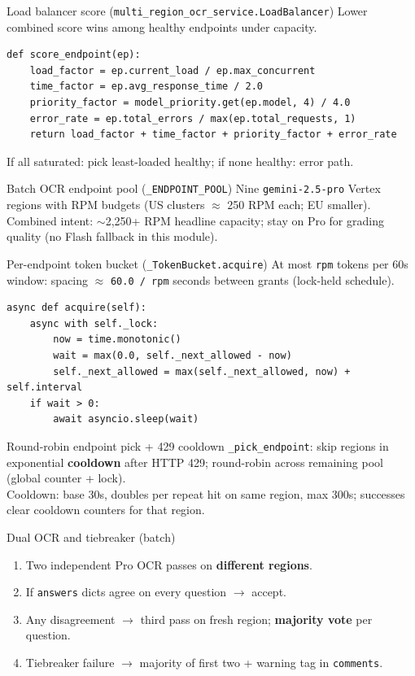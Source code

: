 \documentclass[aspectratio=169]{beamer}
\begin{document}
\begin{frame}[fragile]{Load balancer score (\texttt{multi\_region\_ocr\_service.LoadBalancer})}
  \tiny
  Lower combined score wins among healthy endpoints under capacity.
\begin{lstlisting}[style=py]
def score_endpoint(ep):
    load_factor = ep.current_load / ep.max_concurrent
    time_factor = ep.avg_response_time / 2.0
    priority_factor = model_priority.get(ep.model, 4) / 4.0
    error_rate = ep.total_errors / max(ep.total_requests, 1)
    return load_factor + time_factor + priority_factor + error_rate
\end{lstlisting}
\vfill
\tiny If all saturated: pick least-loaded healthy; if none healthy: error path.
\end{frame}

\begin{frame}{Batch OCR endpoint pool (\texttt{\_ENDPOINT\_POOL})}
  \tiny
  Nine \texttt{gemini-2.5-pro} Vertex regions with RPM budgets (US clusters $\approx$ 250 RPM each; EU smaller). Combined intent: $\sim$2{,}250+ RPM headline capacity; stay on Pro for grading quality (no Flash fallback in this module).
\end{frame}

\begin{frame}[fragile]{Per-endpoint token bucket (\texttt{\_TokenBucket.acquire})}
  \footnotesize
  At most \texttt{rpm} tokens per 60s window: spacing $\approx$ \texttt{60.0 / rpm} seconds between grants (lock-held schedule).
\begin{lstlisting}[style=py]
async def acquire(self):
    async with self._lock:
        now = time.monotonic()
        wait = max(0.0, self._next_allowed - now)
        self._next_allowed = max(self._next_allowed, now) + self.interval
    if wait > 0:
        await asyncio.sleep(wait)
\end{lstlisting}
\end{frame}

\begin{frame}{Round-robin endpoint pick + 429 cooldown}
  \small
  \texttt{\_pick\_endpoint}: skip regions in exponential \textbf{cooldown} after HTTP 429; round-robin across remaining pool (global counter + lock).\\
  Cooldown: base 30s, doubles per repeat hit on same region, max 300s; successes clear cooldown counters for that region.
\end{frame}

\begin{frame}{Dual OCR and tiebreaker (batch)}
  \small
  \begin{enumerate}
    \item Two independent Pro OCR passes on \textbf{different regions}.
    \item If \texttt{answers} dicts agree on every question $\rightarrow$ accept.
    \item Any disagreement $\rightarrow$ third pass on fresh region; \textbf{majority vote} per question.
    \item Tiebreaker failure $\rightarrow$ majority of first two + warning tag in \texttt{comments}.
  \end{enumerate}
\end{frame}
\end{document}

